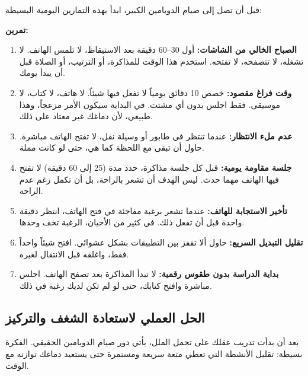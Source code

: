 \documentclass[12pt,a4paper]{book}
\newcommand{\exerciseAr}[1]{%
	\begin{exercise}
		\textbf{تمرين:} #1
	\end{exercise}
}
\begin{document}
قبل أن تصل إلى صيام الدوبامين الكبير، ابدأ بهذه التمارين اليومية البسيطة:
\exerciseAr{
	\begin{enumerate}
		\item \textbf{الصباح الخالي من الشاشات:} أول 30--60 دقيقة بعد الاستيقاظ، لا تلمس الهاتف. لا تشغله، لا تتصفحه، لا تفتحه. استخدم هذا الوقت للمذاكرة، أو الترتيب، أو الصلاة قبل أن يبدأ يومك.
		
		\item \textbf{وقت فراغ مقصود:} خصص 10 دقائق يومياً لا تفعل فيها شيئاً. لا هاتف، لا كتاب، لا موسيقى. فقط اجلس بدون أي مشتت. في البداية سيكون الأمر مزعجاً، وهذا طبيعي، لأن دماغك غير معتاد على ذلك.
		
		\item \textbf{عدم ملء الانتظار:} عندما تنتظر في طابور أو وسيلة نقل، لا تفتح الهاتف مباشرة. حاول أن تبقى مع اللحظة كما هي، حتى لو كانت مملة.
		
		\item \textbf{جلسة مقاومة يومية:} قبل كل جلسة مذاكرة، حدد مدة (25 إلى 60 دقيقة) لا تفتح فيها الهاتف مهما حدث. ليس الهدف أن تشعر بالراحة، بل أن تكمل رغم عدم الراحة.
		
		\item \textbf{تأخير الاستجابة للهاتف:} عندما تشعر برغبة مفاجئة في فتح الهاتف، انتظر دقيقة واحدة قبل أن تفعل ذلك. في كثير من الأحيان، الرغبة تخف وحدها.
		
		\item \textbf{تقليل التبديل السريع:} حاول ألا تقفز بين التطبيقات بشكل عشوائي. افتح شيئاً واحداً فقط، واغلقه قبل الانتقال لغيره.
		
		\item \textbf{بداية الدراسة بدون طقوس رقمية:} لا تبدأ المذاكرة بعد تصفح الهاتف. اجلس مباشرة وافتح كتابك، حتى لو لم تكن لديك رغبة في ذلك.
	\end{enumerate}
}

\subsection{الحل العملي لاستعادة الشغف والتركيز}

بعد أن بدأت تدريب عقلك على تحمل الملل، يأتي دور صيام الدوبامين الحقيقي. الفكرة بسيطة: تقليل الأنشطة التي تعطي متعة سريعة ومستمرة حتى يستعيد دماغك توازنه مع الوقت.
\end{document}

